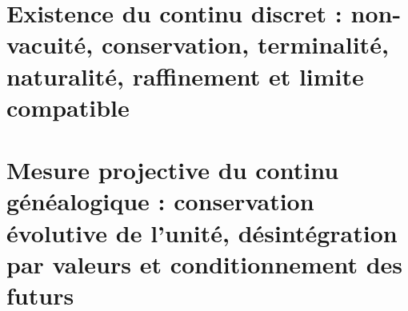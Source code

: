 

\chapter{Existence du continu discret : non-vacuité, conservation, terminalité, naturalité, raffinement et limite compatible}
\label{chap:sucesor-102-06}
\label{owner:sucesor-102-04b3-unico}
















\chapter{Mesure projective du continu généalogique : conservation évolutive de l'unité, désintégration par valeurs et conditionnement des futurs}
\label{chap:sucesor-102-07}



